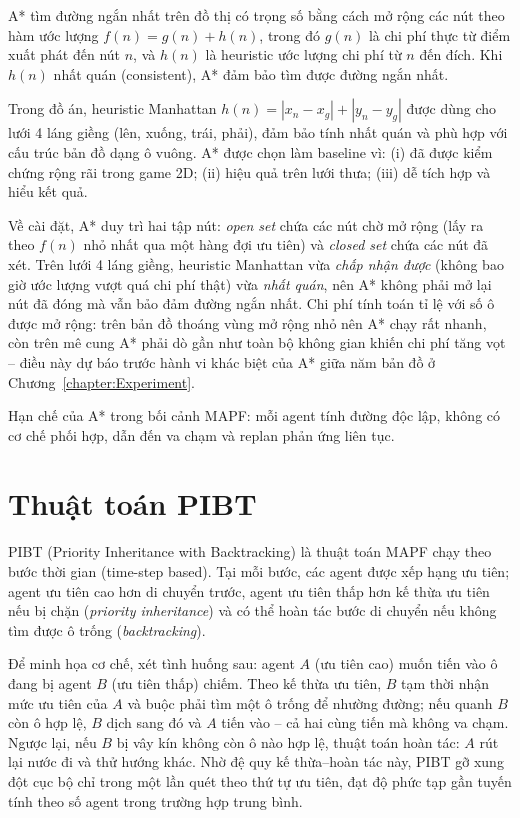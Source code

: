 \documentclass[../DoAn.tex]{subfiles}
\begin{document}
A* \cite{hart1968astar} tìm đường ngắn nhất trên đồ thị có trọng số bằng cách mở
rộng các nút theo hàm ước lượng $f(n) = g(n) + h(n)$, trong đó $g(n)$ là chi phí
thực từ điểm xuất phát đến nút $n$, và $h(n)$ là heuristic ước lượng chi phí từ $n$
đến đích. Khi $h(n)$ nhất quán (consistent), A* đảm bảo tìm được đường ngắn nhất.

Trong đồ án, heuristic Manhattan $h(n) = |x_n - x_g| + |y_n - y_g|$ được dùng cho
lưới 4 láng giềng (lên, xuống, trái, phải), đảm bảo tính nhất quán và phù hợp với
cấu trúc bản đồ dạng ô vuông. A* được chọn làm baseline vì: (i) đã được kiểm chứng
rộng rãi trong game 2D; (ii) hiệu quả trên lưới thưa; (iii) dễ tích hợp và hiểu kết quả.

Về cài đặt, A* duy trì hai tập nút: \emph{open set} chứa các nút chờ mở rộng (lấy ra theo
$f(n)$ nhỏ nhất qua một hàng đợi ưu tiên) và \emph{closed set} chứa các nút đã xét. Trên lưới
4 láng giềng, heuristic Manhattan vừa \emph{chấp nhận được} (không bao giờ ước lượng vượt quá
chi phí thật) vừa \emph{nhất quán}, nên A* không phải mở lại nút đã đóng mà vẫn bảo đảm đường
ngắn nhất. Chi phí tính toán tỉ lệ với số ô được mở rộng: trên bản đồ thoáng vùng mở rộng nhỏ
nên A* chạy rất nhanh, còn trên mê cung A* phải dò gần như toàn bộ không gian khiến chi phí
tăng vọt -- điều này dự báo trước hành vi khác biệt của A* giữa năm bản đồ ở
Chương~\ref{chapter:Experiment}.

Hạn chế của A* trong bối cảnh MAPF: mỗi agent tính đường độc lập, không có cơ chế
phối hợp, dẫn đến va chạm và replan phản ứng liên tục.

\section{Thuật toán PIBT}
\label{section:3.3}

PIBT (Priority Inheritance with Backtracking) \cite{okumura2022pibt} là thuật toán MAPF
chạy theo bước thời gian (time-step based). Tại mỗi bước, các agent được xếp hạng ưu
tiên; agent ưu tiên cao hơn di chuyển trước, agent ưu tiên thấp hơn kế thừa ưu tiên
nếu bị chặn (\textit{priority inheritance}) và có thể hoàn tác bước di chuyển nếu
không tìm được ô trống (\textit{backtracking}).

Để minh họa cơ chế, xét tình huống sau: agent $A$ (ưu tiên cao) muốn tiến vào ô đang bị agent
$B$ (ưu tiên thấp) chiếm. Theo kế thừa ưu tiên, $B$ tạm thời nhận mức ưu tiên của $A$ và buộc
phải tìm một ô trống để nhường đường; nếu quanh $B$ còn ô hợp lệ, $B$ dịch sang đó và $A$ tiến
vào -- cả hai cùng tiến mà không va chạm. Ngược lại, nếu $B$ bị vây kín không còn ô nào hợp lệ,
thuật toán hoàn tác: $A$ rút lại nước đi và thử hướng khác. Nhờ đệ quy kế thừa--hoàn tác này,
PIBT gỡ xung đột cục bộ chỉ trong một lần quét theo thứ tự ưu tiên, đạt độ phức tạp gần tuyến
tính theo số agent trong trường hợp trung bình.
\end{document}
